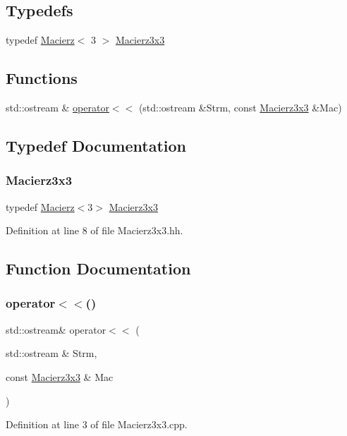 \subsection*{Typedefs}
\begin{DoxyCompactItemize}
\item 
typedef \hyperlink{class_macierz}{Macierz}$<$ 3 $>$ \hyperlink{_macierz3x3_8hh_ad4fc7b0e263d9a99ba6174f68b52ea87}{Macierz3x3}
\end{DoxyCompactItemize}
\subsection*{Functions}
\begin{DoxyCompactItemize}
\item 
std\+::ostream \& \hyperlink{_macierz3x3_8hh_a7d624426c40b579f848005cc55b24ea6}{operator$<$$<$} (std\+::ostream \&Strm, const \hyperlink{_macierz3x3_8hh_ad4fc7b0e263d9a99ba6174f68b52ea87}{Macierz3x3} \&Mac)
\end{DoxyCompactItemize}


\subsection{Typedef Documentation}
\mbox{\label{_macierz3x3_8hh_ad4fc7b0e263d9a99ba6174f68b52ea87}} 
\subsubsection{\texorpdfstring{Macierz3x3}{Macierz3x3}}
{\footnotesize\ttfamily typedef \hyperlink{class_macierz}{Macierz}$<$3$>$ \hyperlink{_macierz3x3_8hh_ad4fc7b0e263d9a99ba6174f68b52ea87}{Macierz3x3}}



Definition at line 8 of file Macierz3x3.\+hh.



\subsection{Function Documentation}
\mbox{\label{_macierz3x3_8hh_a7d624426c40b579f848005cc55b24ea6}} 
\subsubsection{\texorpdfstring{operator$<$$<$()}{operator<<()}}
{\footnotesize\ttfamily std\+::ostream\& operator$<$$<$ (\begin{DoxyParamCaption}\item[{std\+::ostream \&}]{Strm,  }\item[{const \hyperlink{_macierz3x3_8hh_ad4fc7b0e263d9a99ba6174f68b52ea87}{Macierz3x3} \&}]{Mac }\end{DoxyParamCaption})}



Definition at line 3 of file Macierz3x3.\+cpp.

